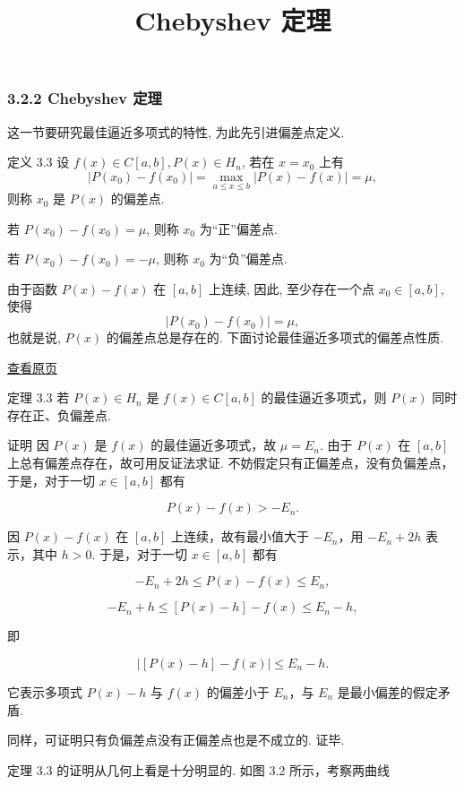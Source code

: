 \documentclass[
  10pt,
  fontset=fandol]{ctexart}
\title{Chebyshev 定理}
\author{}
\date{}
\begin{document}
\maketitle

\subsubsection{3.2.2 Chebyshev 定理}\label{chebyshev-ux5b9aux7406}

这一节要研究最佳逼近多项式的特性, 为此先引进偏差点定义.

定义 3.3 设 \(f(x) \in C[a,b], P(x) \in H_n\), 若在 \(x = x_0\) 上有 \[
|P(x_0) - f(x_0)| = \max_{a \leqslant x \leqslant b}|P(x) - f(x)| = \mu,
\] 则称 \(x_0\) 是 \(P(x)\) 的偏差点.

若 \(P(x_0) - f(x_0) = \mu\), 则称 \(x_0\) 为``正''偏差点.

若 \(P(x_0) - f(x_0) = -\mu\), 则称 \(x_0\) 为``负''偏差点.

由于函数 \(P(x) - f(x)\) 在 \([a,b]\) 上连续, 因此, 至少存在一个点 \(x_0 \in [a,b]\), 使得 \[
|P(x_0) - f(x_0)| = \mu,
\] 也就是说, \(P(x)\) 的偏差点总是存在的. 下面讨论最佳逼近多项式的偏差点性质.

\href{../../source-images/pdf-062.jpeg}{查看原页}

定理 3.3 若 \(P(x) \in H_n\) 是 \(f(x) \in C[a,b]\) 的最佳逼近多项式，则 \(P(x)\) 同时存在正、负偏差点.

证明 因 \(P(x)\) 是 \(f(x)\) 的最佳逼近多项式，故 \(\mu = E_n\). 由于 \(P(x)\) 在 \([a,b]\) 上总有偏差点存在，故可用反证法求证. 不妨假定只有正偏差点，没有负偏差点，于是，对于一切 \(x \in [a,b]\) 都有

\[
P(x) - f(x) > -E_n.
\]

因 \(P(x) - f(x)\) 在 \([a,b]\) 上连续，故有最小值大于 \(-E_n\)，用 \(-E_n + 2h\) 表示，其中 \(h > 0\). 于是，对于一切 \(x \in [a,b]\) 都有

\[
-E_n + 2h \leqslant P(x) - f(x) \leqslant E_n,
\]

\[
-E_n + h \leqslant [P(x) - h] - f(x) \leqslant E_n - h,
\]

即

\[
|[P(x) - h] - f(x)| \leqslant E_n - h.
\]

它表示多项式 \(P(x) - h\) 与 \(f(x)\) 的偏差小于 \(E_n\)，与 \(E_n\) 是最小偏差的假定矛盾.

同样，可证明只有负偏差点没有正偏差点也是不成立的. 证毕.

定理 3.3 的证明从几何上看是十分明显的. 如图 3.2 所示，考察两曲线
\end{document}
